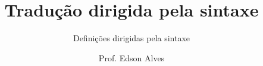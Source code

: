 \title{Tradução dirigida pela sintaxe}
\subtitle{Definições dirigidas pela sintaxe}
\date{}
\author{Prof. Edson Alves}
